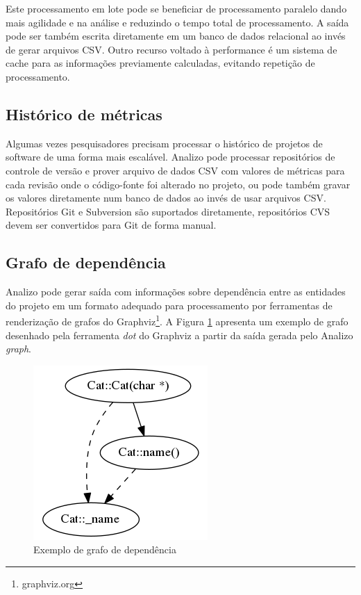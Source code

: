 Este processamento em lote pode se beneficiar de processamento paralelo dando
mais agilidade e na análise e reduzindo o tempo total de processamento.  A
saída pode ser também escrita diretamente em um banco de dados relacional ao
invés de gerar arquivos CSV. Outro recurso voltado à performance é um sistema
de cache para as informações previamente calculadas, evitando repetição de
processamento.

\subsection{Histórico de métricas}

Algumas vezes pesquisadores precisam processar o histórico de projetos de
software de uma forma mais escalável. Analizo pode processar repositórios de
controle de versão e prover arquivo de dados CSV com valores de métricas para
cada revisão onde o código-fonte foi alterado no projeto, ou pode também gravar
os valores diretamente num banco de dados ao invés de usar arquivos CSV. Repositórios Git e
Subversion são suportados diretamente, repositórios CVS devem ser convertidos
para Git de forma manual.

\subsection{Grafo de dependência}

Analizo pode gerar saída com informações sobre dependência entre as entidades
do projeto em um formato adequado para processamento por ferramentas de
renderização de grafos do Graphviz\footnote{graphviz.org}. A Figura
\ref{sample-graph} apresenta um exemplo de grafo desenhado pela ferramenta {\it
dot} do Graphviz a partir da saída gerada pelo Analizo {\it graph}.

\begin{figure}[h]
\center
\includegraphics[scale=0.4]{imagens/sample-graph.png}
\caption{Exemplo de grafo de dependência}
\label{sample-graph}
\end{figure}

